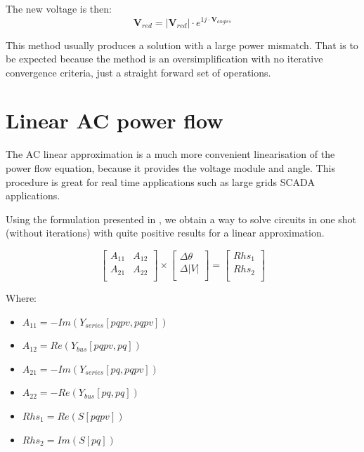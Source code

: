 \documentclass[nols,a4paper,twoside,notoc,fleqn]{tufte-book}
\begin{document}
The new voltage is then:
\begin{equation}
\textbf{V}_{red} = |\textbf{V}_{red}| \cdot e^{1j \cdot  \textbf{V}_{angles}}
\end{equation}

This method usually produces a solution with a large power mismatch. That is to be expected because the method is an oversimplification with no iterative convergence criteria, just a straight forward set of operations.


\section{Linear AC power flow} \label{ACPF}

The AC linear approximation is a much more convenient linearisation of the power flow equation, because it provides the voltage module and angle. This procedure is great for real time applications such as large grids SCADA applications.

Using the formulation presented in \cite{rossoni2016linearized}, we obtain a way to solve circuits in one shot (without iterations) with quite positive results for a linear approximation.

\begin{equation}
\begin{bmatrix}
A_{11} & A_{12} \\
A_{21} & A_{22} \\
\end{bmatrix}
\times
\begin{bmatrix}
\Delta \theta\\
\Delta |V|\\
\end{bmatrix}
=
\begin{bmatrix}
Rhs_1\\
Rhs_2\\
\end{bmatrix}
\label{eq:AC_linear_power_flow}
\end{equation}

Where:
\begin{itemize}
	\item $A_{11} = -Im\left(Y_{series}[pqpv, pqpv]\right)$
	\item $A_{12} = Re\left(Y_{bus}[pqpv, pq]\right)$
	\item $A_{21} = -Im\left(Y_{series}[pq, pqpv]\right)$
	\item $A_{22} = -Re\left(Y_{bus}[pq, pq]\right)$
	\item $Rhs_1 = Re(S[pqpv])$
	\item $Rhs_2 = Im(S[pq])$\newline
\end{itemize}
\end{document}

